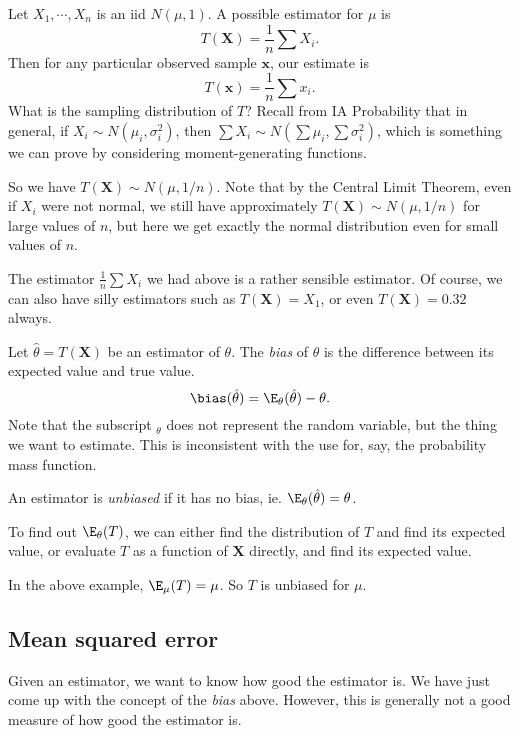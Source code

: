 \documentclass[a4paper]{article}
\begin{document}
\begin{eg}
  Let $X_1, \cdots, X_n$ is an iid $N(\mu, 1)$. A possible estimator for $\mu$ is
  \[
    T(\mathbf{X}) = \frac{1}{n}\sum X_i.
  \]
  Then for any particular observed sample $\mathbf{x}$, our estimate is
  \[
    T(\mathbf{x}) = \frac{1}{n}\sum x_i.
  \]
  What is the sampling distribution of $T$? Recall from IA Probability that in general, if $X_i \sim N(\mu_i, \sigma_i^2)$, then $\sum X_i \sim N(\sum \mu_i, \sum \sigma_i^2)$, which is something we can prove by considering moment-generating functions.

  So we have $T(\mathbf{X})\sim N(\mu, 1/n)$. Note that by the Central Limit Theorem, even if $X_i$ were not normal, we still have approximately $T(\mathbf{X})\sim N(\mu, 1/n)$ for large values of $n$, but here we get exactly the normal distribution even for small values of $n$.
\end{eg}
The estimator $\frac{1}{n}\sum X_i$ we had above is a rather sensible estimator. Of course, we can also have silly estimators such as $T(\mathbf{X}) = X_1$, or even $T(\mathbf{X}) = 0.32$ always.

\begin{defi}[Bias]
  Let $\hat{\theta} = T(\mathbf{X})$ be an estimator of $\theta$. The \emph{bias} of $\hat{\theta}$ is the difference between its expected value and true value.
  \[
    \bias(\hat{\theta}) = \E_\theta(\hat{\theta}) - \theta.
  \]
  Note that the subscript $_\theta$ does not represent the random variable, but the thing we want to estimate. This is inconsistent with the use for, say, the probability mass function.

  An estimator is \emph{unbiased} if it has no bias, ie. $\E_\theta(\hat{\theta}) = \theta$.
\end{defi}
To find out $\E_\theta (T)$, we can either find the distribution of $T$ and find its expected value, or evaluate $T$ as a function of $\mathbf{X}$ directly, and find its expected value.

\begin{eg}
  In the above example, $\E_\mu(T) =\mu$. So $T$ is unbiased for $\mu$.
\end{eg}

\subsection{Mean squared error}
Given an estimator, we want to know how good the estimator is. We have just come up with the concept of the \emph{bias} above. However, this is generally not a good measure of how good the estimator is.
\end{document}
